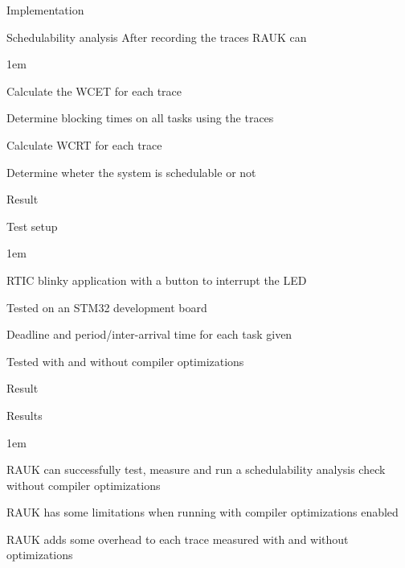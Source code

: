 \begin{frame}{Implementation}
    \begin{block}{Schedulability analysis}
        After recording the traces RAUK can
        \begin{itemize-size}{1em}
            \vspace{0.5em}
            \item Calculate the WCET for each trace
            \item Determine blocking times on all tasks using the traces
            \item Calculate WCRT for each trace
            \item Determine wheter the system is schedulable or not
        \end{itemize-size}  
    \end{block}
\end{frame}

\begin{frame}{Result}
    \begin{block}{Test setup}
        \begin{itemize-size}{1em}
            \item RTIC blinky application with a button to interrupt the LED
            \item Tested on an STM32 development board
            \item Deadline and period/inter-arrival time for each
            task given
            \item Tested with and without compiler optimizations
        \end{itemize-size}
    \end{block}
\end{frame}

\begin{frame}{Result}
    \begin{block}{Results}
        \begin{itemize-size}{1em}
            \item RAUK can successfully test, measure and
            run a schedulability analysis check without compiler optimizations
            \item RAUK has some limitations when running with compiler optimizations
            enabled
            \item RAUK adds some overhead to each trace measured with and without
            optimizations
        \end{itemize-size}
    \end{block}
\end{frame}
